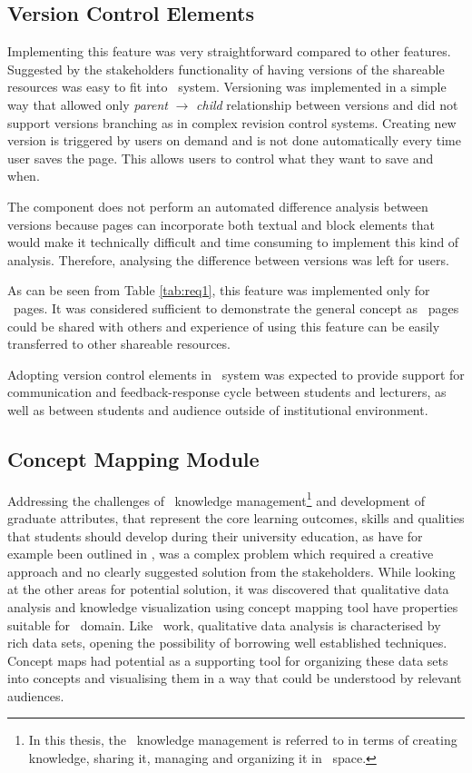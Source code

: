\subsection{Version Control Elements}
\label{sec:version}
Implementing this feature was very straightforward compared to other features.
Suggested by the stakeholders functionality of having versions of the shareable
resources was easy to fit into \ep~system. Versioning was implemented in a
simple way that allowed only \textit{parent} $\to$ \textit{child} relationship
between versions and did not support versions branching as in complex revision
control systems. Creating new version is triggered by users on demand and is
not done automatically every time user saves the page. This allows users to
control what they want to save and when. 

The component does not perform an automated difference analysis between versions
because pages can incorporate both textual and block elements that would make it
technically difficult and time consuming to implement this kind of analysis.
Therefore, analysing the difference between versions was left for users.
 
As can be seen from Table \ref{tab:req1}, this feature was implemented only for
\ep~pages. It was considered sufficient to demonstrate the general concept as
\ep~pages could be shared with others and experience of using this feature can
be easily transferred to other shareable resources.

Adopting version control elements in \ep~system was expected to provide support
for communication and feedback-response cycle between students and lecturers, as
well as between students and audience outside of institutional environment.

\subsection{Concept Mapping Module}
\label{sec:mapping}
Addressing the challenges of \ep~knowledge management\footnote{In this thesis,
the \ep~knowledge management is referred to in terms of creating knowledge,
sharing it, managing and organizing it in \ep~space.} and development of
graduate attributes, that represent the core learning outcomes, skills and
qualities that students should develop during their university education, as
have for example been outlined in \citet{Hughes2010}, was a complex problem
which required a creative approach and no clearly suggested solution from the
stakeholders. While looking at the other areas for potential solution, it was
discovered that qualitative data analysis and knowledge visualization using
concept mapping tool have properties suitable for \ep~domain. Like \ep~work,
qualitative data analysis is characterised by rich data sets, opening the
possibility of borrowing well established techniques. Concept maps had potential
as a supporting tool for organizing these data sets into concepts and
visualising them in a way that could be understood by relevant audiences.

